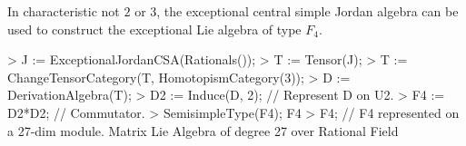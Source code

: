 \begin{example}[ChevalleyShaferF4]
In characteristic not $2$ or $3$, the exceptional central 
simple Jordan algebra can be used to construct
the exceptional Lie algebra of type $F_4$.

\begin{code}
> J := ExceptionalJordanCSA(Rationals());
> T := Tensor(J);                                     
> T := ChangeTensorCategory(T, HomotopismCategory(3));
> D := DerivationAlgebra(T);
> D2 := Induce(D, 2);           // Represent D on U2.
> F4 := D2*D2;                  // Commutator.
> SemisimpleType(F4);
F4
> F4;               // F4 represented on a 27-dim module.
Matrix Lie Algebra of degree 27 over Rational Field
\end{code}
\end{example}

